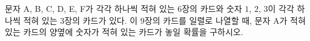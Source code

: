 문자 A, B, C, D, E, F가 각각 하나씩 적혀 있는 $6$장의 카드와 숫자 $1$, $2$, $3$이 각각 하나씩 적혀 있는 $3$장의 카드가 있다. 이 $9$장의 카드를 일렬로 나열할 때, 문자 A가 적혀 있는 카드의 양옆에 숫자가 적혀 있는 카드가 놓일 확률을 구하시오.
